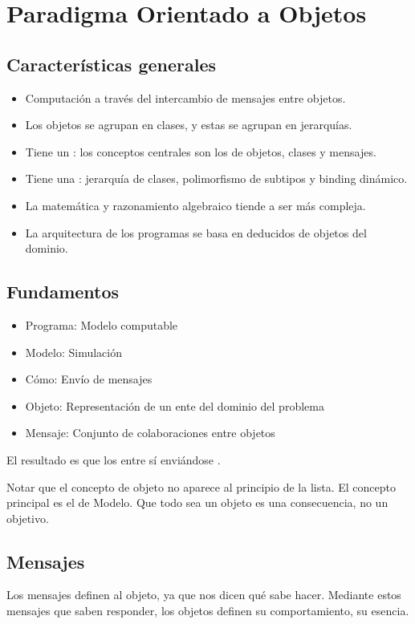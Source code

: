 \section{Paradigma Orientado a Objetos}

\subsection{Características generales}

\begin{itemize}
  \item Computación a través del intercambio de mensajes entre objetos.
  \item Los objetos se agrupan en clases, y estas se agrupan en jerarquías.
  \item Tiene un : los conceptos centrales son los de objetos, clases y mensajes.
  \item Tiene una : jerarquía de clases, polimorfismo de subtipos y binding dinámico.
  \item La matemática y razonamiento algebraico tiende a ser más compleja.
  \item La arquitectura de los programas se basa en  deducidos de objetos del dominio.
\end{itemize}

\subsection{Fundamentos}

\begin{itemize}
  \item Programa: Modelo computable
  \item Modelo: Simulación
  \item Cómo: Envío de mensajes
  \item Objeto: Representación de un ente del dominio del problema
  \item Mensaje: Conjunto de colaboraciones entre objetos
\end{itemize}

El resultado es que los  entre sí enviándose .

Notar que el concepto de objeto no aparece al principio de la lista. El concepto principal es el de Modelo. Que todo sea un objeto es una consecuencia, no un objetivo.

\subsection{Mensajes}
 Los mensajes definen al objeto, ya que nos dicen qué sabe hacer.
 Mediante estos mensajes que saben responder, los objetos definen su comportamiento, su esencia.

